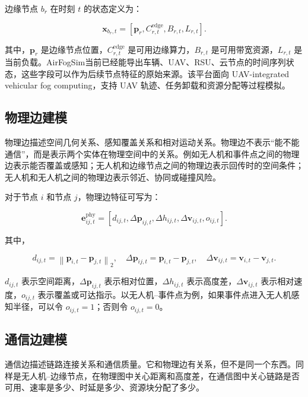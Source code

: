 ﻿\documentclass[UTF8,a4paper,11pt]{ctexart}
\begin{document}
边缘节点 $b_r$ 在时刻 $t$ 的状态定义为：

\begin{equation}
\mathbf{x}_{b_r,t}
=
\left[
\mathbf{p}_r,
C_{r,t}^{\mathrm{edge}},
B_{r,t},
L_{r,t}
\right].
\end{equation}

其中，$\mathbf{p}_r$ 是边缘节点位置，$C_{r,t}^{\mathrm{edge}}$ 是可用边缘算力，$B_{r,t}$ 是可用带宽资源，$L_{r,t}$ 是当前负载。AirFogSim\cite{wei2024airfogsim}当前已经能导出车辆、UAV、RSU、云节点的时间序列状态，这些字段可以作为后续节点特征的原始来源。该平台面向 UAV-integrated vehicular fog computing，支持 UAV 轨迹、任务卸载和资源分配等过程模拟。

\subsection{物理边建模}

物理边描述空间几何关系、感知覆盖关系和相对运动关系。物理边不表示“能不能通信”，而是表示两个实体在物理空间中的关系。例如无人机和事件点之间的物理边表示能否覆盖或感知；无人机和边缘节点之间的物理边表示回传时的空间条件；无人机和无人机之间的物理边表示邻近、协同或碰撞风险。

对于节点 $i$ 和节点 $j$，物理边特征可写为：

\begin{equation}
\mathbf{e}_{ij,t}^{\mathrm{phy}}
=
\left[
d_{ij,t},
\Delta\mathbf{p}_{ij,t},
\Delta h_{ij,t},
\Delta\mathbf{v}_{ij,t},
o_{ij,t}
\right].
\end{equation}

其中，

\begin{equation}
d_{ij,t}=\left\|\mathbf{p}_{i,t}-\mathbf{p}_{j,t}\right\|_2,\quad
\Delta\mathbf{p}_{ij,t}=\mathbf{p}_{i,t}-\mathbf{p}_{j,t},\quad
\Delta\mathbf{v}_{ij,t}=\mathbf{v}_{i,t}-\mathbf{v}_{j,t}.
\end{equation}

$d_{ij,t}$ 表示空间距离，$\Delta\mathbf{p}_{ij,t}$ 表示相对位置，$\Delta h_{ij,t}$ 表示高度差，$\Delta\mathbf{v}_{ij,t}$ 表示相对速度，$o_{ij,t}$ 表示覆盖或可达指示。以无人机--事件点为例，如果事件点进入无人机感知半径，可以令 $o_{ij,t}=1$；否则令 $o_{ij,t}=0$。

\subsection{通信边建模}

通信边描述链路连接关系和通信质量。它和物理边有关系，但不是同一个东西。同样是无人机--边缘节点，在物理图中关心距离和高度差，在通信图中关心链路是否可用、速率是多少、时延是多少、资源块分配了多少。
\end{document}
